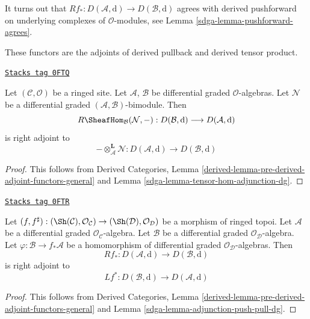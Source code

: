 It turns out that
$Rf_* : D(\mathcal{A}, \text{d}) \to D(\mathcal{B}, \text{d})$
agrees with derived pushforward on underlying complexes
of $\mathcal{O}$-modules, see Lemma \ref{sdga-lemma-pushforward-agrees}.

\medskip\noindent
These functors are the adjoints of derived pullback and
derived tensor product.

\begin{lemma}
\label{sdga-lemma-derived-adjoint-tensor-hom}
\href{https://stacks.math.columbia.edu/tag/0FTQ}{\texttt{Stacks tag 0FTQ}}

Let $(\mathcal{C}, \mathcal{O})$ be a ringed site. Let
$\mathcal{A}$, $\mathcal{B}$ be differential graded $\mathcal{O}$-algebras.
Let $\mathcal{N}$ be a  differential graded
$(\mathcal{A}, \mathcal{B})$-bimodule. Then
$$
R\SheafHom_\mathcal{B}(\mathcal{N}, -) :
D(\mathcal{B}, \text{d})
\longrightarrow
D(\mathcal{A}, \text{d})
$$
is right adjoint to
$$
- \otimes_\mathcal{A}^\mathbf{L} \mathcal{N} :
D(\mathcal{A}, \text{d})
\longrightarrow
D(\mathcal{B}, \text{d})
$$
\end{lemma}

\begin{proof}

This follows from Derived Categories, Lemma
\ref{derived-lemma-pre-derived-adjoint-functors-general}
and Lemma \ref{sdga-lemma-tensor-hom-adjunction-dg}.
\end{proof}

\begin{lemma}
\label{sdga-lemma-derived-adjoint-push-pull}
\href{https://stacks.math.columbia.edu/tag/0FTR}{\texttt{Stacks tag 0FTR}}

Let $(f, f^\sharp) : (\Sh(\mathcal{C}), \mathcal{O}_\mathcal{C})
\to (\Sh(\mathcal{D}), \mathcal{O}_\mathcal{D})$
be a morphism of ringed topoi. Let $\mathcal{A}$ be a differential
graded $\mathcal{O}_\mathcal{C}$-algebra. Let $\mathcal{B}$ be a
differential graded $\mathcal{O}_\mathcal{D}$-algebra. Let
$\varphi : \mathcal{B} \to f_*\mathcal{A}$ be a homomorphism
of differential graded $\mathcal{O}_\mathcal{D}$-algebras.
Then
$$
Rf_* :
D(\mathcal{A}, \text{d})
\longrightarrow
D(\mathcal{B}, \text{d})
$$
is right adjoint to
$$
Lf^* :
D(\mathcal{B}, \text{d})
\longrightarrow
D(\mathcal{A}, \text{d})
$$
\end{lemma}

\begin{proof}

This follows from Derived Categories, Lemma
\ref{derived-lemma-pre-derived-adjoint-functors-general}
and Lemma \ref{sdga-lemma-adjunction-push-pull-dg}.
\end{proof}

